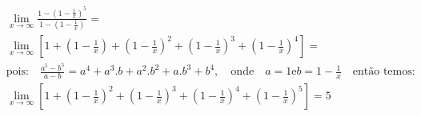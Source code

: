 \begin{ex}
\begin{align}
&\lim_{x\rightarrow \infty} \frac{1-\left(1-\frac{1}{x}\right)^5}{1-\left(1-\frac{1}{x}\right)}=\nonumber\\
&\lim_{x\rightarrow \infty} \left[1+\left(1-\frac{1}{x}\right)+\left(1-\frac{1}{x}\right)^2+\left(1-\frac{1}{x}\right)^3+\left(1-\frac{1}{x}\right)^4\right]=\nonumber\\
&\text {pois:} \quad \frac{a^5-b^5}{a-b}=a^4+a^3.b+a^2.b^2+a.b^3+b^4,\quad\text{onde}\quad a=1\text{e} b=1-\frac{1}{x} \quad \text {então temos:}\nonumber\\
&\lim_{x\rightarrow \infty} \left[1+\left(1-\frac{1}{x}\right)^2+\left(1-\frac{1}{x}\right)^3+\left(1-\frac{1}{x}\right)^4+\left(1-\frac{1}{x}\right)^5\right]=5\nonumber
\end{align}
\end{ex}
